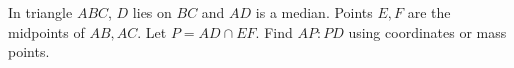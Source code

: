 In triangle $ABC$, $D$ lies on $BC$ and $AD$ is a median. Points $E,F$ are the midpoints of $AB,AC$. Let $P=AD\cap EF$. Find $AP:PD$ using coordinates or mass points.
